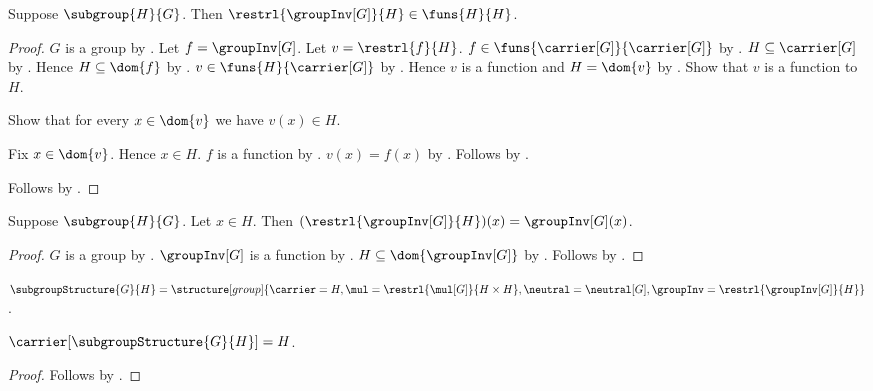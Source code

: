 \begin{proposition}\label{subgroup_inv_restriction_type}
    Suppose $\subgroup{H}{G}$.
    Then $\restrl{\groupInv[G]}{H}\in\funs{H}{H}$.
\end{proposition}
\begin{proof}
    $G$ is a group by .
    Let $f=\groupInv[G]$.
    Let $v=\restrl{f}{H}$.
    $f\in\funs{\carrier[G]}{\carrier[G]}$ by
        .
    $H\subseteq\carrier[G]$ by .
    Hence $H\subseteq\dom{f}$ by .
    $v\in\funs{H}{\carrier[G]}$ by .
    Hence $v$ is a function and $H=\dom{v}$ by .
    Show that $v$ is a function to $H$.
    \begin{subproof}
        Show that for every $x\in\dom{v}$ we have $v(x)\in H$.
        \begin{subproof}
            Fix $x\in\dom{v}$.
            Hence $x\in H$.
            $f$ is a function by .
            $v(x)=f(x)$ by .
            Follows by .
        \end{subproof}
    \end{subproof}
    Follows by .
\end{proof}

\begin{proposition}\label{subgroup_inv_restriction_apply}
    Suppose $\subgroup{H}{G}$.
    Let $x\in H$.
    Then $(\restrl{\groupInv[G]}{H})(x)=\groupInv[G](x)$.
\end{proposition}
\begin{proof}
    $G$ is a group by .
    $\groupInv[G]$ is a function by
        .
    $H\subseteq\dom{\groupInv[G]}$ by
        .
    Follows by .
\end{proof}

\begin{definition}\label{subgroup_structure}
    $\subgroupStructure{G}{H}=
        \structure[group]{
            \carrier=H,
            \mul=\restrl{\mul[G]}{H\times H},
            \neutral=\neutral[G],
            \groupInv=\restrl{\groupInv[G]}{H}
        }$.
\end{definition}

\begin{proposition}\label{subgroup_structure_carrier}
    $\carrier[\subgroupStructure{G}{H}]=H$.
\end{proposition}
\begin{proof}
    Follows by
        .
\end{proof}

